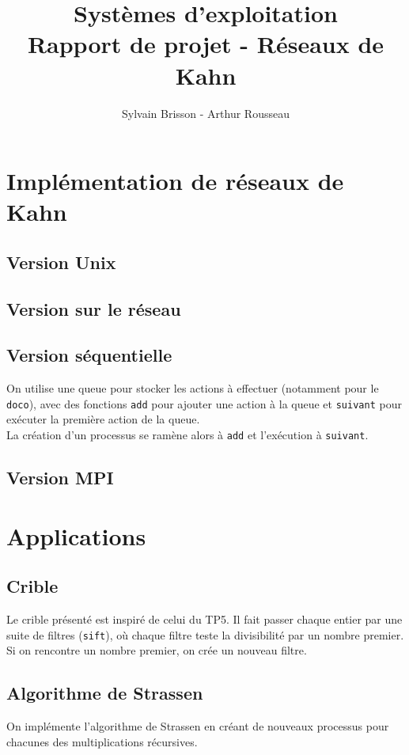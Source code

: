 \documentclass[a4paper]{article}
\title{Systèmes d'exploitation\\Rapport de projet - Réseaux de Kahn}
\author{Sylvain Brisson - Arthur Rousseau}
\date{}
\begin{document}
    \maketitle
    \noindent
    \section{Implémentation de réseaux de Kahn}
    \subsection{Version Unix}
    \subsection{Version sur le réseau}
    \subsection{Version séquentielle}
        On utilise une queue pour stocker les actions à effectuer (notamment pour le \texttt{doco}), avec des fonctions \texttt{add} pour ajouter une action à la queue et \texttt{suivant} pour exécuter la première action de la queue.\\
        La création d'un processus se ramène alors à \texttt{add} et l'exécution à \texttt{suivant}.
    \subsection{Version MPI}
    \section{Applications}
    \subsection{Crible}
        Le crible présenté est inspiré de celui du TP5. Il fait passer chaque entier par une suite de filtres (\texttt{sift}), où chaque filtre teste la divisibilité par un nombre premier. Si on rencontre un nombre premier, on crée un nouveau filtre.
    \subsection{Algorithme de Strassen}
        On implémente l'algorithme de Strassen en créant de nouveaux processus pour chacunes des multiplications récursives.
\end{document}
